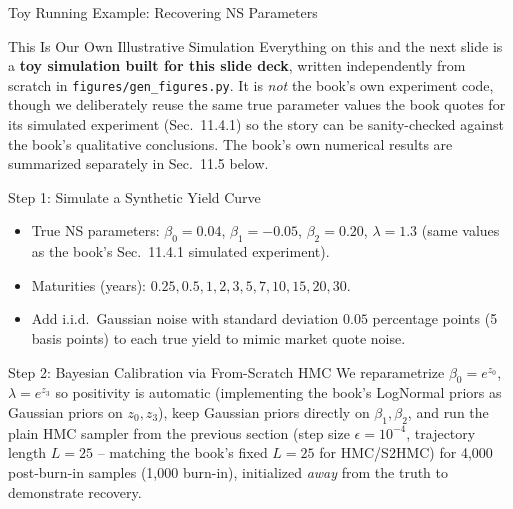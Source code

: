 \documentclass[aspectratio=169,10pt]{beamer}
\begin{document}
\begin{frame}[allowframebreaks]{Toy Running Example: Recovering NS Parameters}

\begin{alertblock}{This Is Our Own Illustrative Simulation}
  Everything on this and the next slide is a \textbf{toy simulation built
  for this slide deck}, written independently from scratch in
  \texttt{figures/gen\_figures.py}. It is \emph{not} the book's own
  experiment code, though we deliberately reuse the same true parameter
  values the book quotes for its simulated experiment (Sec.\ 11.4.1) so
  the story can be sanity-checked against the book's qualitative
  conclusions. The book's own numerical results are summarized
  separately in Sec.\ 11.5 below.
\end{alertblock}

\begin{block}{Step 1: Simulate a Synthetic Yield Curve}
  \begin{itemize}
    \item True NS parameters: $\beta_0=0.04$, $\beta_1=-0.05$,
      $\beta_2=0.20$, $\lambda=1.3$ (same values as the book's Sec.\ 11.4.1
      simulated experiment).
    \item Maturities (years): $0.25, 0.5, 1, 2, 3, 5, 7, 10, 15, 20, 30$.
    \item Add i.i.d.\ Gaussian noise with standard deviation $0.05$
      percentage points (5 basis points) to each true yield to mimic market
      quote noise.
  \end{itemize}
\end{block}

\begin{block}{Step 2: Bayesian Calibration via From-Scratch HMC}
  We reparametrize $\beta_0 = e^{z_0}$, $\lambda = e^{z_3}$ so positivity is
  automatic (implementing the book's LogNormal priors as Gaussian priors on
  $z_0, z_3$), keep Gaussian priors directly on $\beta_1,\beta_2$, and run
  the plain HMC sampler from the previous section (step size
  $\epsilon = 10^{-4}$, trajectory length $L=25$ -- matching the book's
  fixed $L=25$ for HMC/S2HMC) for 4{,}000 post-burn-in samples (1{,}000
  burn-in), initialized \emph{away} from the truth to demonstrate recovery.
\end{block}

\framebreak


\end{frame}
\end{document}
